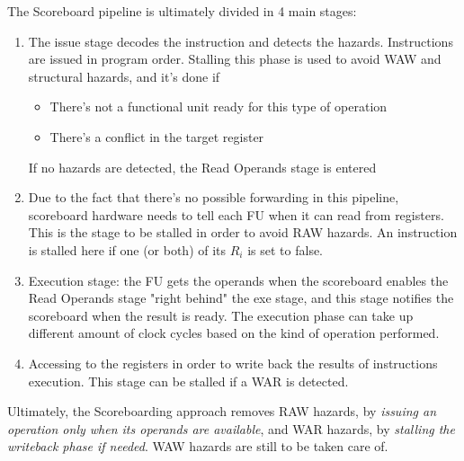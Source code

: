 \documentclass[10pt,a4paper]{article}
\begin{document}
				The Scoreboard pipeline is ultimately divided in 4 main stages:
				\begin{enumerate}
					\item The issue stage decodes the instruction and detects the hazards. Instructions are issued in program order. Stalling this phase is used to avoid WAW and structural hazards, and it's done if 
						\begin{itemize}
							\item There's not a functional unit ready for this type of operation
							\item There's a conflict in the target register
						\end{itemize}
						If no hazards are detected, the Read Operands stage is entered
					\item Due to the fact that there's no possible forwarding in this pipeline, scoreboard hardware needs to tell each FU when it can read from registers. This is the stage to be stalled in order to avoid RAW hazards. An instruction is stalled here if one (or both) of its $R_i$ is set to false.
			 		\item Execution stage: the FU gets the operands when the scoreboard enables the Read Operands stage "right behind" the exe stage, and this stage notifies the scoreboard when the result is ready. The execution phase can take up different amount of clock cycles based on the kind of operation performed.
		 			\item Accessing to the registers in order to write back the results of instructions execution. This stage can be stalled if a WAR is detected.
 				\end{enumerate}
 				Ultimately, the Scoreboarding approach removes RAW hazards, by \emph{issuing an operation only when its operands are available}, and WAR hazards, by \emph{stalling the writeback phase if needed}. WAW hazards are still to be taken care of.
 				
 				
					
\end{document}
